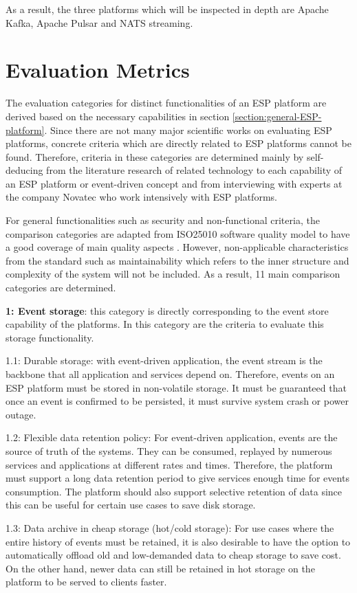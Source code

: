 As a result, the three platforms which will be inspected in depth are Apache Kafka, Apache Pulsar and NATS streaming.

\section{Evaluation Metrics}
The evaluation categories for distinct functionalities of an ESP platform are derived based on the necessary capabilities in section \ref{section:general-ESP-platform}. Since there are not many major scientific works on evaluating ESP platforms, concrete criteria which are directly related to ESP platforms cannot be found. Therefore, criteria in these categories are determined mainly by self-deducing from the literature research of related technology to each capability of an ESP platform or event-driven concept and from interviewing with experts at the company Novatec who work intensively with ESP platforms.

For general functionalities such as security and non-functional criteria, the comparison categories are adapted from ISO25010 software quality model to have a good coverage of main quality aspects \cite{iso25010}. However, non-applicable characteristics from the standard such as maintainability which refers to the inner structure and complexity of the system will not be included. As a result, 11 main comparison categories are determined. 


\textbf{1: Event storage}: this category is directly corresponding to the event store capability of the platforms. In this category are the criteria to evaluate this storage functionality.

1.1: Durable storage: with event-driven application, the event stream is the backbone that all application and services depend on. Therefore, events on an ESP platform must be stored in non-volatile storage. It must be guaranteed that once an event is confirmed to be persisted, it must survive system crash or power outage.

1.2: Flexible data retention policy: For event-driven application, events are the source of truth of the systems. They can be consumed, replayed by numerous services and applications at different rates and times. Therefore, the platform must support a long data retention period to give services enough time for events consumption. The platform should also support selective retention of data since this can be useful for certain use cases to save disk storage.

1.3: Data archive in cheap storage (hot/cold storage): For use cases where the entire history of events must be retained, it is also desirable to have the option to automatically offload old and low-demanded data to cheap storage to save cost. On the other hand, newer data can still be retained in hot storage on the platform to be served to clients faster.

